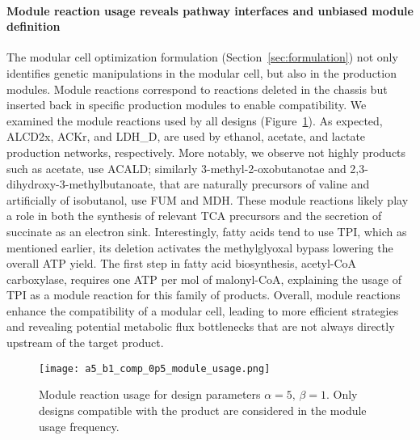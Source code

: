 {\paragraph{Module reaction usage reveals pathway interfaces and unbiased module definition}
The modular cell optimization formulation (Section~\ref{sec:formulation}) not only identifies genetic manipulations in the modular cell, but also in the production modules.
Module reactions correspond to reactions deleted in the chassis but inserted back in specific production modules to enable compatibility.
We examined the module reactions used by all designs (Figure~\ref{fig7:module-usage}).
As expected, ALCD2x, ACKr, and LDH\_D, are used by ethanol, acetate, and lactate production networks, respectively.
More notably, we observe not highly products such as acetate, use ACALD; similarly 3-methyl-2-oxobutanotae and 2,3-dihydroxy-3-methylbutanoate, that are naturally precursors of valine and artificially of isobutanol\citep{atsumi2008,atsumi2010}, use FUM and MDH.
These module reactions likely play a role in both the synthesis of relevant TCA precursors and the secretion of succinate as an electron sink.
Interestingly, fatty acids tend to use TPI, which as mentioned earlier, its deletion activates the methylglyoxal bypass lowering the overall ATP yield.
The first step in fatty acid biosynthesis, acetyl-CoA carboxylase, requires one ATP per mol of malonyl-CoA, explaining the usage of TPI as a module reaction for this family of products.
Overall, module reactions enhance the compatibility of a modular cell, leading to more efficient strategies and revealing potential metabolic flux bottlenecks that are not always directly upstream of the target product.

\begin{figure}[h]
    \centering
    \texttt{[image: a5\_b1\_comp\_0p5\_module\_usage.png]}
    \caption[Module reaction usage]{Module reaction usage for design parameters $\alpha=5, \,\beta=1$. Only designs compatible with the product are considered in the module usage frequency.}%
    \label{fig7:module-usage}
\end{figure}

}
